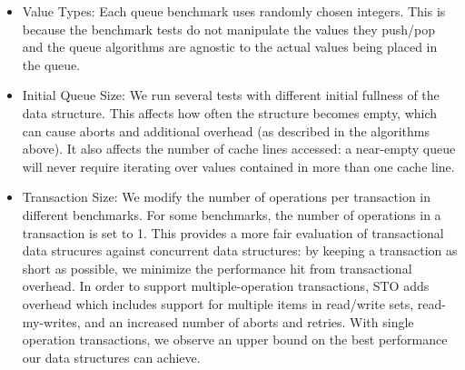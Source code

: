 \begin{itemize}
\item Value Types: Each queue benchmark uses randomly chosen integers. This is because the benchmark tests do not manipulate the values they push/pop and the queue algorithms are agnostic to the actual values being placed in the queue.

\item Initial Queue Size: We run several tests with different initial fullness of the data structure. This affects how often the structure becomes empty, which can cause aborts and additional overhead (as described in the algorithms above). It also affects the number of cache lines accessed: a near-empty queue will never require iterating over values contained in more than one cache line.

\item Transaction Size: We modify the number of operations per transaction in different benchmarks. For some benchmarks, the number of operations in a transaction is set to 1. This provides a more fair evaluation of transactional data strucures against concurrent data structures: by keeping a transaction as short as possible, we minimize the performance hit from transactional overhead. In order to support multiple-operation transactions, STO adds overhead which includes support for multiple items in read/write sets, read-my-writes, and an increased number of aborts and retries. With single operation transactions, we observe an upper bound on the best performance our data structures can achieve.

\end{itemize}


